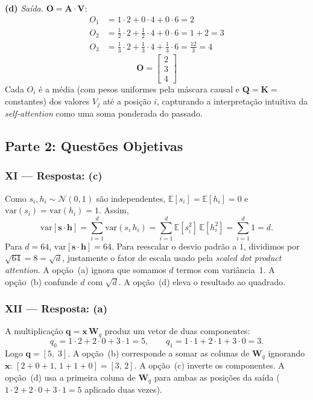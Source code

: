\documentclass{dlproblemset}
\begin{document}
\begin{enumerate}[I)]
\textbf{(d)} \textit{Saída.} $\mathbf{O} = \mathbf{A} \cdot \mathbf{V}$:
\begin{align*}
O_1 &= 1 \cdot 2 + 0 \cdot 4 + 0 \cdot 6 = 2 \\
O_2 &= \tfrac{1}{2} \cdot 2 + \tfrac{1}{2} \cdot 4 + 0 \cdot 6 = 1 + 2 = 3 \\
O_3 &= \tfrac{1}{3} \cdot 2 + \tfrac{1}{3} \cdot 4 + \tfrac{1}{3} \cdot 6 = \tfrac{12}{3} = 4
\end{align*}
\[
\mathbf{O} = \begin{bmatrix} 2 \\ 3 \\ 4 \end{bmatrix}
\]
Cada $O_i$ é a média (com pesos uniformes pela máscara causal e $\mathbf{Q} = \mathbf{K} = $ constantes) dos valores $V_j$ até a posição $i$, capturando a interpretação intuitiva da \textit{self-attention} como uma soma ponderada do passado.

\end{enumerate}

\subsection*{Parte 2: Questões Objetivas}

\subsubsection*{XI — Resposta: (c)}
Como $s_i, h_i \sim \mathcal{N}(0, 1)$ são independentes,
$\mathbb{E}[s_i] = \mathbb{E}[h_i] = 0$ e $\mathrm{var}(s_i) = \mathrm{var}(h_i) = 1$.
Assim,
\[
  \mathrm{var}[\mathbf{s} \cdot \mathbf{h}]
    = \sum_{i=1}^{d} \mathrm{var}(s_i\, h_i)
    = \sum_{i=1}^{d} \mathbb{E}[s_i^2]\,\mathbb{E}[h_i^2]
    = \sum_{i=1}^{d} 1 = d.
\]
Para $d = 64$, $\mathrm{var}[\mathbf{s} \cdot \mathbf{h}] = 64$. Para reescalar o desvio
padrão a $1$, dividimos por $\sqrt{64} = 8 = \sqrt{d}$, justamente o fator de
escala usado pela \textit{scaled dot product attention}.
A opção~(a) ignora que somamos $d$ termos com variância~1. A opção~(b) confunde
$d$ com $\sqrt{d}$. A opção~(d) eleva o resultado ao quadrado.

\subsubsection*{XII — Resposta: (a)}
A multiplicação $\mathbf{q} = \mathbf{x}\, \mathbf{W}_q$ produz um vetor de duas componentes:
\[
  q_0 = 1\cdot 2 + 2\cdot 0 + 3\cdot 1 = 5, \qquad
  q_1 = 1\cdot 1 + 2\cdot 1 + 3\cdot 0 = 3.
\]
Logo $\mathbf{q} = [5,\;3]$.
A opção~(b) corresponde a somar as colunas de $\mathbf{W}_q$ ignorando $\mathbf{x}$:
$[2+0+1,\,1+1+0] = [3,\,2]$. A opção~(c) inverte os componentes. A
opção~(d) usa a primeira coluna de $\mathbf{W}_q$ para ambas as posições da saída
($1\cdot 2 + 2\cdot 0 + 3\cdot 1 = 5$ aplicado duas vezes).
\end{document}
